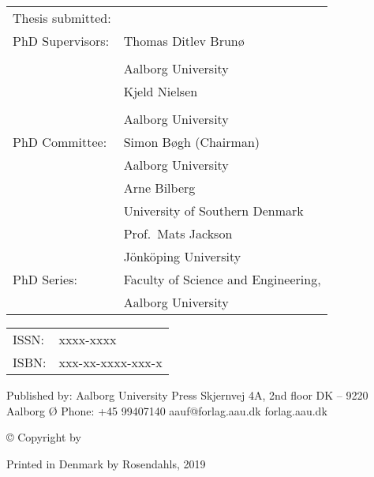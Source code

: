\thispagestyle{empty}
\noindent
\begin{tabularx}{\textwidth}{@{}lX}
    Thesis submitted:& \docSubmission{}\\[.5\baselineskip]
    PhD Supervisors:& \AProf{} Thomas Ditlev Brunø\\
                    & \Department{}\\
                    & Aalborg University\\[.5\baselineskip]
                    & \AProf{} Kjeld Nielsen\\
                    & \Department{}\\
                    & Aalborg University\\[.5\baselineskip]
    PhD Committee:  & \AProf{} Simon Bøgh (Chairman)\\
                    & Aalborg University\\[.5\baselineskip]
                    & \AProf{} Arne Bilberg\\ 
                    & University of Southern Denmark\\[.5\baselineskip]
                    & Prof.\ Mats Jackson\\ 
                    & Jönköping University\\[.5\baselineskip]
    PhD Series:& Faculty of Science and Engineering,\\
              & Aalborg University\\
\end{tabularx}

\strut\vfill
\noindent
\begin{tabularx}{\textwidth}{@{}lX}
    ISSN:\@ & xxxx-xxxx\\
    ISBN:\@ & xxx-xx-xxxx-xxx-x\\
\end{tabularx}
\strut\vfill
\noindent Published by:\newline
Aalborg University Press\newline
Skjernvej 4A, 2nd floor\newline
DK – 9220 Aalborg Ø\newline
Phone: +45 99407140\newline
aauf@forlag.aau.dk\newline
forlag.aau.dk
\strut\vfill
\noindent \copyright{} Copyright by \docAuthor\newline
\strut\vfill
\noindent Printed in Denmark by Rosendahls, 2019
\clearpage